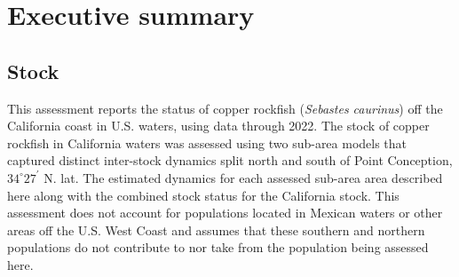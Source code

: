 \documentclass[11pt,
  letterpaper,
]{article}
\begin{document}
\newpage
\thispagestyle{empty} %

\pagestyle{plain}  %
\renewcommand*{\thefootnote}{\arabic{footnote}}  %
\setcounter{footnote}{0}  %
\renewcommand{\headrulewidth}{0.5pt}
\renewcommand{\footrulewidth}{0.5pt}

\newcommand{\lt}{\ensuremath <}
\newcommand{\gt}{\ensuremath >}

\newcommand\CapeM{$40^\circ 10^\prime$ N. lat.}
\newcommand\PtC{$34^\circ 27^\prime$ N. lat.}
\newcommand\CAOR{$42^\circ 00^\prime$ N. lat.}

\pagebreak
{}
\setcounter{page}{1}

\renewcommand{\thetable}{\roman{table}}
\renewcommand{\thefigure}{\roman{figure}}

\setlength\parskip{0.5em plus 0.1em minus 0.2em}

\vspace{500cm}

\pagebreak

\section*{Executive summary}\label{executive-summary}

\subsection*{Stock}\label{stock}

This assessment reports the status of copper rockfish (\emph{Sebastes caurinus}) off the California coast in U.S. waters, using data through 2022. The stock of copper rockfish in California waters was assessed using two sub-area models that captured distinct inter-stock dynamics split north and south of Point Conception, $34^\circ 27^\prime$ N. lat. The estimated dynamics for each assessed sub-area area described here along with the combined stock status for the California stock. This assessment does not account for populations located in Mexican waters or other areas off the U.S. West Coast and assumes that these southern and northern populations do not contribute to nor take from the population being assessed here.
\end{document}
